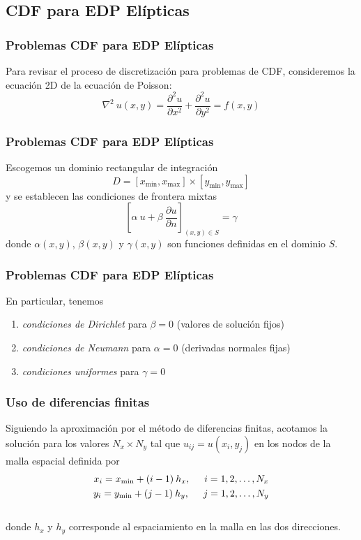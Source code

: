 \documentclass[12pt]{beamer}
\begin{document}
\subsection{CDF para EDP Elípticas}
\begin{frame}
\frametitle{Problemas CDF para EDP Elípticas}
Para revisar el proceso de discretización para problemas de CDF, consideremos la ecuación 2D de la ecuación de Poisson:
\begin{equation}
\nabla^{2} \: u(x, y) = \dfrac{\partial^{2} u}{\partial x^{2}} + \dfrac{\partial^{2} u}{\partial y^{2}} = f(x, y)
\label{eq:ecuacion_13_01}
\end{equation}
\end{frame}
\begin{frame}
\frametitle{Problemas CDF para EDP Elípticas}
Escogemos un dominio rectangular de integración 
\[ D = [x_{\mbox{min}}, x_{\mbox{max}} ] \times [y_{\mbox{min}}, y_{\mbox{max}} ]  \]
y se establecen las condiciones de frontera mixtas
\begin{equation}
\left[ \alpha \: u + \beta \: \dfrac{\partial u}{\partial n} \right]_{(x, y) \in S} = \gamma
\label{eq:ecuacion_13_02}
\end{equation}
donde $\alpha(x, y)$, $\beta(x, y)$ y $\gamma(x, y)$ son funciones definidas en el dominio $S$.
\end{frame}
\begin{frame}
\frametitle{Problemas CDF para EDP Elípticas}
En particular, tenemos
\begin{enumerate}[<+->]
\item \emph{condiciones de Dirichlet} para $\beta = 0$ (valores de solución fijos)
\item \emph{condiciones de Neumann} para $\alpha = 0$ (derivadas normales fijas)
\item \emph{condiciones uniformes} para $\gamma = 0$
\end{enumerate}
\end{frame}
\begin{frame}
\frametitle{Uso de diferencias finitas}
Siguiendo la aproximación por el método de diferencias finitas, acotamos la solución para los valores $N_{x} \times N_{y}$ tal que $u_{ij} = u(x_{i}, y_{j})$ en los nodos de la malla espacial definida por
\begin{align*}
x_{i} = x_{\text{min}} + (i - 1) \: h_{x}, \hspace{0.5cm} i = 1, 2, \ldots, N_{x} \\
y_{i} = y_{\text{min}} + (j - 1) \: h_{y}, \hspace{0.5cm} j = 1, 2, \ldots, N_{y}
\end{align*}
\\
\bigskip
\pause
donde $h_{x}$ y $h_{y}$ corresponde al espaciamiento en la malla en las dos direcciones.
\end{frame}
\end{document}
